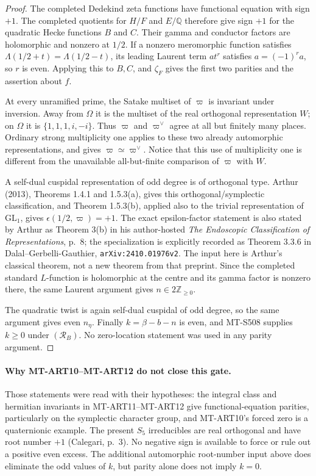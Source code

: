 \begin{proof}
The completed Dedekind zeta functions have functional equation with
sign $+1$. The completed quotients for $H/F$ and $E/\mathbb Q$
therefore give sign $+1$ for the quadratic Hecke functions $B$ and
$C$. Their gamma and conductor factors are holomorphic and nonzero
at $1/2$. If a nonzero meromorphic function satisfies
$\Lambda(1/2+t)=\Lambda(1/2-t)$, its leading Laurent term
$a t^r$ satisfies $a=(-1)^r a$, so $r$ is even. Applying this to
$B,C$, and $\zeta_F$ gives the first two parities and the assertion
about $f$.

At every unramified prime, the Satake multiset of $\varpi$ is
invariant under inversion. Away from $\Omega$ it is the multiset
of the real orthogonal representation $W$; on $\Omega$ it is
$\{1,1,1,i,-i\}$. Thus $\varpi$ and $\varpi^\vee$ agree at all
but finitely many places. Ordinary strong multiplicity one applies
to these two already automorphic representations, and gives
$\varpi\simeq\varpi^\vee$. Notice that this use of multiplicity
one is different from the unavailable all-but-finite comparison
of $\varpi$ with $W$.

A self-dual cuspidal representation of odd degree is of orthogonal
type. Arthur (2013), Theorems 1.4.1 and 1.5.3(a), gives this
orthogonal/symplectic classification, and Theorem 1.5.3(b), applied
also to the trivial representation of $\mathrm{GL}_1$, gives
$\epsilon(1/2,\varpi)=+1$. The exact epsilon-factor statement is
also stated by Arthur as Theorem 3(b) in his author-hosted
\emph{The Endoscopic Classification of Representations}, p.~8;
the specialization is explicitly recorded as Theorem 3.3.6 in
Dalal--Gerbelli-Gauthier, \texttt{arXiv:2410.01976v2}. The input
here is Arthur's classical theorem, not a new theorem from that
preprint. Since the completed standard $L$-function is holomorphic
at the centre and its gamma factor is nonzero there, the same
Laurent argument gives $n\in2\mathbb Z_{\ge0}$.

The quadratic twist is again self-dual cuspidal of odd degree, so
the same argument gives even $n_\eta$. Finally $k=\beta-b-n$ is
even, and MT-S508 supplies $k\ge0$ under $(\mathcal R_B)$.
No zero-location statement was used in any parity argument.
\end{proof}

\paragraph{Why MT-ART10--MT-ART12 do not close this gate.}
Those statements were read with their hypotheses: the integral
class and hermitian invariants in MT-ART11--MT-ART12 give
functional-equation parities, particularly on the symplectic
character group, and MT-ART10's forced zero is a quaternionic
example. The present $S_5$ irreducibles are real orthogonal and
have root number $+1$ (Calegari, p.~3). No negative sign is available
to force or rule out a positive even excess. The additional
automorphic root-number input above does eliminate the odd values
of $k$, but parity alone does not imply $k=0$.

